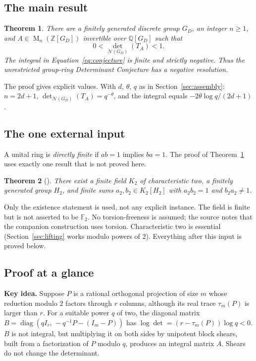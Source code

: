 \documentclass[11pt]{article}
\newtheorem{theorem}{Theorem}[section]
\theoremstyle{remark}
\numberwithin{equation}{section}
\newcommand{\F}{\mathbb F}
\newcommand{\Z}{\mathbb Z}
\newcommand{\Q}{\mathbb Q}
\newcommand{\Mat}{\operatorname{M}}
\newcommand{\diag}{\operatorname{diag}}
\newcommand{\N}{\mathcal N}
\begin{document}
\subsection{The main result}

\begin{theorem}\label{thm:main}
There are a finitely generated discrete group $G_D$, an integer
$n\ge1$, and $A\in\Mat_n(\Z[G_D])$ invertible over $\Q[G_D]$ such
that
\[
 0<\det_{\N(G_D)}(T_A)<1.
\]
The integral in Equation~\eqref{eq:conjecture} is finite and strictly
negative. Thus the unrestricted group-ring Determinant Conjecture
has a negative resolution.
\end{theorem}

The proof gives explicit values. With $d$, $\theta$, $q$ as in Section~\ref{sec:assembly}: $n=2d+1$, $\det_{\N(G_D)}(T_A)=q^{-\theta}$, and the integral equals $-2\theta\log q/(2d+1)$.

\subsection{The one external input}

A unital ring is \emph{directly finite} if $ab=1$ implies $ba=1$. The proof of Theorem~\ref{thm:main} uses exactly one result that is not proved here.

\begin{theorem}[{\cite[Theorem 1.1]{CharacteristicTwo}}]
\label{thm:input}
There exist a finite field $K_2$ of characteristic two, a finitely
generated group $H_2$, and finite sums $a_2,b_2\in K_2[H_2]$ with
$a_2b_2=1$ and $b_2a_2\ne1$.
\end{theorem}

Only the existence statement is used, not any explicit instance. The field is finite but is not asserted to be $\F_2$. No torsion-freeness is assumed; the source notes that the companion construction uses torsion. Characteristic two is essential (Section~\ref{sec:lifting} works modulo powers of $2$). Everything after this input is proved below.

\subsection{Proof at a glance}

\textbf{Key idea.} Suppose $P$ is a rational orthogonal projection of size $m$ whose reduction modulo $2$ factors through $r$ columns, although its real trace $\tau_m(P)$ is larger than $r$. For a suitable power $q$ of two, the diagonal matrix $B=\diag(qI_r,\,-q^{-1}P-(I_m-P))$ has $\log\det=(r-\tau_m(P))\log q<0$. $B$ is not integral, but multiplying it on both sides by unipotent block shears, built from a factorization of $P$ modulo $q$, produces an integral matrix $A$. Shears do not change the determinant.
\end{document}
